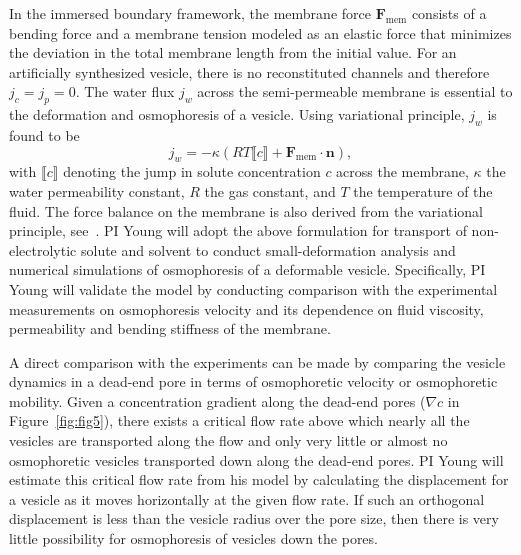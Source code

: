 \documentclass[11pt]{article}
\begin{document}
In the immersed boundary framework, the membrane force $\mathbf{F}
_{\mbox{mem}}$ consists of a bending force and a membrane tension
modeled as an elastic force that minimizes the deviation in the total
membrane length from the initial value. For an artificially synthesized
vesicle, there is no reconstituted channels and therefore $j_c=j_p=0$.
The water flux $j_w$ across the semi-permeable membrane is essential to
the deformation and osmophoresis of a vesicle.  Using variational
principle, $j_w$ is found to be
\begin{equation}
\label{eq:jw}
 j_w =-\kappa\left(RT \llbracket c \rrbracket + 
   \mathbf{F}_{\mbox{mem}} \cdot \mathbf{n}\right),
\end{equation}
with $\llbracket c \rrbracket$ denoting the jump in solute concentration $c$ across the
membrane, $\kappa$ the water permeability constant, $R$ the gas
constant, and $T$ the temperature of the fluid.  The force balance on
the membrane is also derived from the variational principle,
see~\cite{YaoMori2017_JCP}.  PI Young will adopt the above formulation
for transport of non-electrolytic solute and solvent to conduct
small-deformation analysis and numerical simulations of osmophoresis of
a deformable vesicle.  Specifically, PI Young will validate the model by
conducting comparison with the experimental measurements on osmophoresis
velocity and its dependence on fluid viscosity, permeability and bending
stiffness of the membrane. 

A direct comparison with the experiments can be made by comparing the
vesicle dynamics in a dead-end pore in terms of osmophoretic velocity or
osmophoretic mobility.  Given a concentration gradient along the
dead-end pores ($\nabla c$ in Figure~\ref{fig:fig5}), there exists a
critical flow rate above which nearly all the vesicles are transported
along the flow and only very little or almost no osmophoretic vesicles
transported down along the dead-end pores.  PI Young will estimate this
critical flow rate from his model by calculating the displacement for a
vesicle as it moves horizontally at the given flow rate.  If such an
orthogonal displacement is less than the vesicle radius over the pore
size, then there is very little possibility for osmophoresis of vesicles
down the pores.
\end{document}
